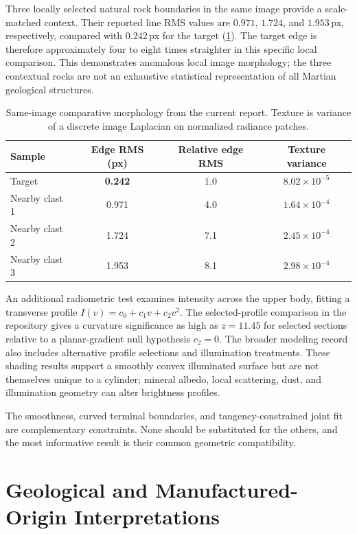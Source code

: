 \documentclass[11pt,letterpaper]{article}
\newcommand{\px}{\,\mathrm{px}}
\begin{document}
Three locally selected natural rock boundaries in the same image provide a scale-matched context. Their reported line RMS values are \(0.971\), \(1.724\), and \(1.953\px\), respectively, compared with \(0.242\px\) for the target (\cref{tab:rocks}). The target edge is therefore approximately four to eight times straighter in this specific local comparison. This demonstrates anomalous local image morphology; the three contextual rocks are not an exhaustive statistical representation of all Martian geological structures.

\begin{table}[ht]
\centering\small
\caption{Same-image comparative morphology from the current report. Texture is variance of a discrete image Laplacian on normalized radiance patches.}
\label{tab:rocks}
\begin{tabularx}{\linewidth}{@{}l c c c@{}}
\toprule
\textbf{Sample} & \textbf{Edge RMS (px)} & \textbf{Relative edge RMS} & \textbf{Texture variance} \\
\midrule
Target & \textbf{0.242} & 1.0 & \(8.02\times10^{-5}\) \\
Nearby clast 1 & 0.971 & 4.0 & \(1.64\times10^{-4}\) \\
Nearby clast 2 & 1.724 & 7.1 & \(2.45\times10^{-4}\) \\
Nearby clast 3 & 1.953 & 8.1 & \(2.98\times10^{-4}\) \\
\bottomrule
\end{tabularx}
\end{table}

An additional radiometric test examines intensity across the upper body, fitting a transverse profile \(I(v)=c_0+c_1v+c_2v^2\). The selected-profile comparison in the repository gives a curvature significance as high as \(z=11.45\) for selected sections relative to a planar-gradient null hypothesis \(c_2=0\). The broader modeling record also includes alternative profile selections and illumination treatments. These shading results support a smoothly convex illuminated surface but are not themselves unique to a cylinder; mineral albedo, local scattering, dust, and illumination geometry can alter brightness profiles.

The smoothness, curved terminal boundaries, and tangency-constrained joint fit are complementary constraints. None should be substituted for the others, and the most informative result is their common geometric compatibility.

\section{Geological and Manufactured-Origin Interpretations}
\label{sec:origin}
\end{document}
